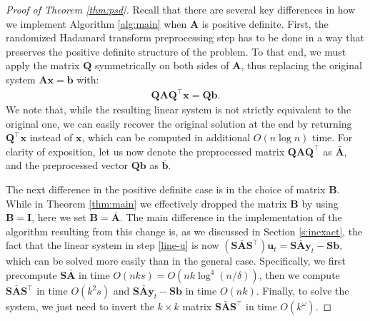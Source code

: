 \documentclass[11pt]{article}
\let\origtop\top
\renewcommand\top{{\scriptscriptstyle{\origtop}}}
\def\x{{\mathbf x}}
\def\u{{\mathbf u}}
\def\y{{\mathbf y}}
\def\b{{\mathbf b}}
\def\A{{\mathbf A}}
\def\B{{\mathbf B}}
\def\I{{\mathbf I}}
\def\Q{{\mathbf Q}}
\def\S{{\mathbf S}}
\begin{document}
\begin{proof}[Proof of Theorem \ref{thm:psd}]
Recall that there are several key differences in how we implement Algorithm \ref{alg:main} when $\A$ is positive definite. First, the randomized Hadamard transform preprocessing step has to be done in a way that preserves the positive definite structure of the problem. To that end, we must apply the matrix $\Q$ symmetrically on both sides of $\A$, thus replacing the original system $\A\x=\b$ with:
\begin{align*}
    \Q\A\Q^\top\x = \Q\b.
\end{align*}    
We note that, while the resulting linear system is not strictly equivalent to the original one, we can easily recover the original solution at the end by returning $\Q^\top\x$ instead of $\x$, which can be computed in additional $O(n\log n)$ time. For clarity of exposition, let us now denote the preprocessed matrix $\Q\A\Q^\top$ as $\bar\A$, and the preprocessed vector $\Q\b$ as $\bar\b$.

 The next difference in the positive definite case is in the choice of matrix $\B$. While in Theorem \ref{thm:main} we effectively dropped the matrix $\B$ by using $\B=\I$, here we set $\B=\bar\A$. The main difference in the implementation of the algorithm resulting from this change is, as we discussed in Section \ref{s:inexact}, the fact that the linear system in step \ref{line-u} is now $(\S\bar\A\S^\top)\u_t=\S\bar\A\y_t-\S\b$, which can be solved more easily than in the general case. Specifically, we first precompute $\S\bar\A$ in time $O(nks)=O(nk\log^4(n/\delta))$, then we compute $\S\bar\A\S^\top$ in time $O(k^2s)$ and $\S\bar\A\y_t-\S\b$ in time $O(nk)$. Finally, to solve the system, we just need to invert the $k\times k$ matrix $\S\bar\A\S^\top$ in time $O(k^\omega)$. 


\end{proof}
\end{document}
